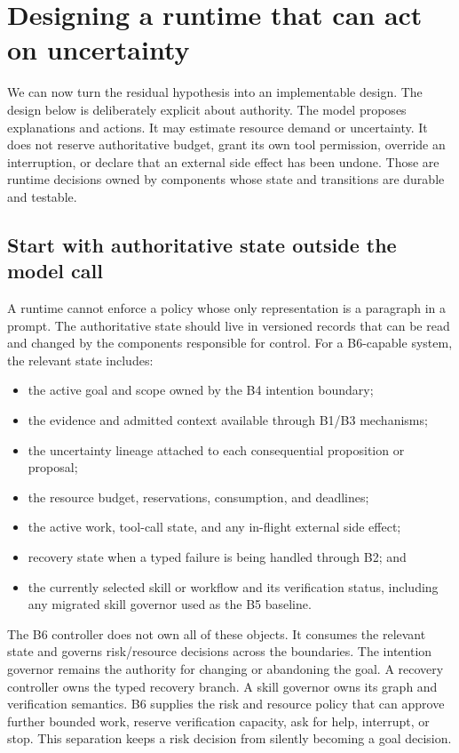 \section{Designing a runtime that can act on uncertainty}
\label{sec:ch16-runtime-design}

We can now turn the residual hypothesis into an implementable design. The design below is deliberately explicit about authority. The model proposes explanations and actions. It may estimate resource demand or uncertainty. It does not reserve authoritative budget, grant its own tool permission, override an interruption, or declare that an external side effect has been undone. Those are runtime decisions owned by components whose state and transitions are durable and testable.

\subsection{Start with authoritative state outside the model call}
\label{sec:ch16-authoritative-state}

A runtime cannot enforce a policy whose only representation is a paragraph in a prompt. The authoritative state should live in versioned records that can be read and changed by the components responsible for control. For a B6-capable system, the relevant state includes:

\begin{itemize}
  \item the active goal and scope owned by the B4 intention boundary;
  \item the evidence and admitted context available through B1/B3 mechanisms;
  \item the uncertainty lineage attached to each consequential proposition or proposal;
  \item the resource budget, reservations, consumption, and deadlines;
  \item the active work, tool-call state, and any in-flight external side effect;
  \item recovery state when a typed failure is being handled through B2; and
  \item the currently selected skill or workflow and its verification status, including any migrated skill governor used as the B5 baseline.
\end{itemize}

The B6 controller does not own all of these objects. It consumes the relevant state and governs risk/resource decisions across the boundaries. The intention governor remains the authority for changing or abandoning the goal. A recovery controller owns the typed recovery branch. A skill governor owns its graph and verification semantics. B6 supplies the risk and resource policy that can approve further bounded work, reserve verification capacity, ask for help, interrupt, or stop. This separation keeps a risk decision from silently becoming a goal decision.

